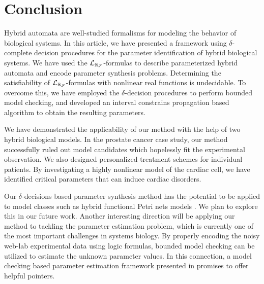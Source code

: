 \section{Conclusion}
Hybrid automata are well-studied formalisms for modeling the behavior of biological systems. In this article, we have presented a framework using $\delta$-complete decision procedures for the parameter identification of hybrid biological systems. We have used the $\mathcal{L}_{\mathbb{R}_{\mathcal{F}}}$-formulas to describe parameterized hybrid automata and encode parameter synthesis problems. Determining the satisfiability of $\mathcal{L}_{\mathbb{R}_{\mathcal{F}}}$-formulas with nonlinear real functions is undecidable. To overcome this, we have employed the $\delta$-decision procedures to perform bounded model checking, and developed an interval constrains propagation based algorithm to obtain the resulting parameters.

We have demonstrated the applicability of our method with the help of two hybrid biological models. In the prostate cancer case study, our method successfully ruled out model candidates which hopelessly fit the experimental observation. We also designed personalized treatment schemes for individual patients. By investigating a highly nonlinear model of the cardiac cell, we have identified critical parameters that can induce cardiac disorders.

Our $\delta$-decisions based parameter synthesis method has the potential to be applied to model classes such as hybrid functional Petri nets models \citep{hfpn}. We plan to explore this in our future work. Another interesting direction will be applying our method to tackling the parameter estimation problem, which is currently one of the most important challenges in systems biology. By properly encoding the noisy web-lab experimental data using logic formulas, bounded model checking can be utilized to estimate the unknown parameter values. In this connection, a model checking based parameter estimation framework presented in \cite{liu13} promises to offer helpful pointers.









